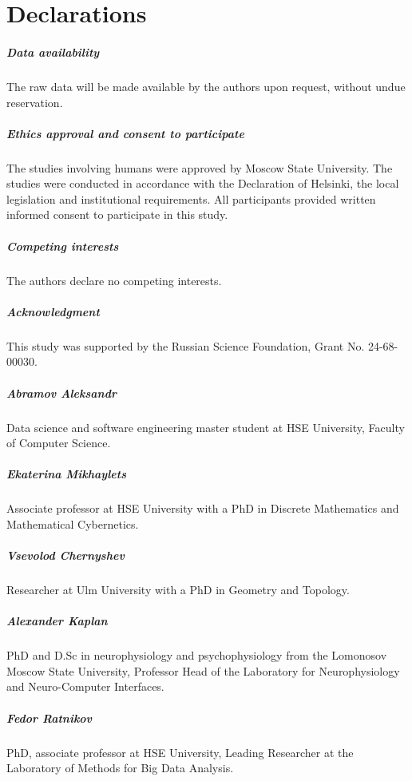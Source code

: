 \documentclass[pdflatex,sn-basic,Numbered]{sn-jnl}
\begin{document}
\section*{Declarations}

\subparagraph{\textbf{Data availability}}
The raw data will be made available by the authors upon request, without undue reservation.

\subparagraph{\textbf{Ethics approval and consent to participate}}
The studies involving humans were approved by Moscow State University. The studies were conducted in accordance with the Declaration of Helsinki, the local legislation and institutional requirements. All participants provided written informed consent to participate in this study.

\subparagraph{\textbf{Competing interests}}
The authors declare no competing interests.

\subparagraph{\textbf{Acknowledgment}}
This study was supported by the Russian Science Foundation, Grant No. 24-68-00030.



\subparagraph{\textbf{Abramov Aleksandr}} Data science and software engineering master student at HSE University, Faculty of Computer Science.
\subparagraph{\textbf{Ekaterina Mikhaylets}} Associate professor at HSE University with a PhD in Discrete Mathematics and Mathematical Cybernetics.
\subparagraph{\textbf{Vsevolod Chernyshev}} Researcher at Ulm University with a PhD in Geometry and Topology.
\subparagraph{\textbf{Alexander Kaplan}} PhD and D.Sc in neurophysiology and psychophysiology from the Lomonosov Moscow State University, Professor Head of the Laboratory for Neurophysiology and Neuro-Computer Interfaces.
\subparagraph{\textbf{Fedor Ratnikov}} PhD, associate professor at HSE University, Leading Researcher at the Laboratory of Methods for Big Data Analysis.
\end{document}
